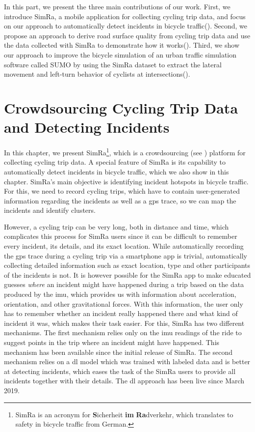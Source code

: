\vspace*{\fill}
In this part, we present the three main contributions of our work.
First, we introduce SimRa, a mobile application for collecting cycling trip data, and focus on our approach to automatically detect incidents in bicycle traffic().
Second, we propose an approach to derive road surface quality from cycling trip data and use the data collected with SimRa to demonstrate how it works().
Third, we show our approach to improve the bicycle simulation of an urban traffic simulation software called SUMO by using the SimRa dataset to extract the lateral movement and left-turn behavior of cyclists at intersections().
\vspace*{\fill}
\cleardoublepage
\newpage
\chapter{Crowdsourcing Cycling Trip Data and Detecting Incidents}
\label{cha:cyclesense}
In this chapter, we present SimRa\footnote{SimRa is an acronym for \textbf{S}icherheit \textbf{im} \textbf{Ra}dverkehr, which translates to safety in bicycle traffic from German.}, which is a crowdsourcing (see ) platform for collecting cycling trip data.
A special feature of SimRa is its capability to automatically detect incidents in bicycle traffic, which we also show in this chapter.
SimRa's main objective is identifying incident hotspots in bicycle traffic.
For this, we need to record cycling trips, which have to contain user-generated information regarding the incidents as well as a \ac{gps} trace, so we can map the incidents and identify clusters.

However, a cycling trip can be very long, both in distance and time, which complicates this process for SimRa users since it can be difficult to remember every incident, its details, and its exact location.
While automatically recording the \ac{gps} trace during a cycling trip via a smartphone app is trivial, automatically collecting detailed information such as exact location, type and other participants of the incidents is not.
It is however possible for the SimRa app to make educated guesses \textit{where} an incident might have happened during a trip based on the data produced by the \ac{imu}, which provides us with information about acceleration, orientation, and other gravitational forces.
With this information, the user only has to remember whether an incident really happened there and what kind of incident it was, which makes their task easier.
For this, SimRa has two different mechanisms.
The first mechanism relies only on the \ac{imu} readings of the ride to suggest points in the trip where an incident might have happened.
This mechanism has been available since the initial release of SimRa.
The second mechanism relies on a \ac{dl} model which was trained with labeled data and is better at detecting incidents, which eases the task of the SimRa users to provide all incidents together with their details.
The \ac{dl} approach has been live since March 2019.

